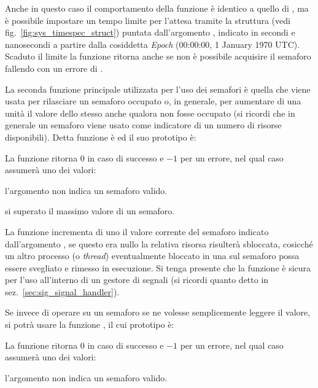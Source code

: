 Anche in questo caso il comportamento della funzione è identico a quello di
, ma è possibile impostare un tempo limite per l'attesa
tramite la struttura  (vedi
fig.~\ref{fig:sys_timespec_struct}) puntata
dall'argomento , indicato in secondi e nanosecondi a
partire dalla cosiddetta \textit{Epoch} (00:00:00, 1 January 1970
UTC). Scaduto il limite la funzione ritorna anche se non è possibile acquisire
il semaforo fallendo con un errore di .

La seconda funzione principale utilizzata per l'uso dei semafori è quella che
viene usata per rilasciare un semaforo occupato o, in generale, per aumentare
di una unità il valore dello stesso anche qualora non fosse occupato (si
ricordi che in generale un semaforo viene usato come indicatore di un numero
di risorse disponibili). Detta funzione è  ed il suo
prototipo è:

\begin{funcproto}{

}

{La funzione ritorna $0$ in caso di successo e $-1$ per un errore, nel qual
  caso  assumerà uno dei valori:
  \begin{errlist}
    \item[\errcode{EINVAL}] l'argomento  non indica un semaforo
      valido.
    \item[\errcode{EOVERFLOW}] si superato il massimo valore di un semaforo.
  \end{errlist}
}  
\end{funcproto}

La funzione incrementa di uno il valore corrente del semaforo indicato
dall'argomento , se questo era nullo la relativa risorsa risulterà
sbloccata, cosicché un altro processo (o \textit{thread}) eventualmente
bloccato in una  sul semaforo possa essere svegliato e rimesso
in esecuzione.  Si tenga presente che la funzione è sicura per l'uso
all'interno di un gestore di segnali (si ricordi quanto detto in
sez.~\ref{sec:sig_signal_handler}).

Se invece di operare su un semaforo se ne volesse semplicemente leggere il
valore, si potrà usare la funzione , il cui prototipo è:

\begin{funcproto}{

}
{La funzione ritorna $0$ in caso di successo e $-1$ per un errore, nel qual
  caso  assumerà uno dei valori:
  \begin{errlist}
    \item[\errcode{EINVAL}] l'argomento  non indica un semaforo
      valido.
  \end{errlist}
}  
\end{funcproto}


